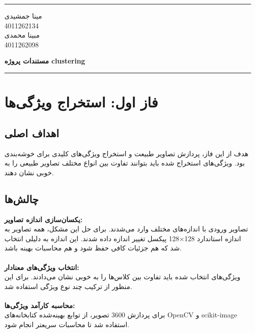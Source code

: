 \documentclass[a4paper,12pt]{article}
\newcommand{\StudentOne}{4011262134}
\newcommand{\StudentTwo}{4011262098}
\newcommand{\NameOne}{مینا جمشیدی}
\newcommand{\NameTwo}{مبینا محمدی}
\newcommand{\ProjectName}{مستندات پروژه clustering}
\let\nobreaksection\section
\renewcommand{\section}{\nobreaksection}
\begin{document}
	

	\hrule \medskip
	\begin{minipage}{0.3\textwidth}
		\raggedright
		\small
		\NameOne \\
		\StudentOne \\
		\NameTwo \\
		\StudentTwo
	\end{minipage}
	\begin{minipage}{0.4\textwidth} 
		\centering 
		\large\bfseries
		\ProjectName \\
	\end{minipage}
	\begin{minipage}{0.3\textwidth}
		\raggedleft
		\small
	\end{minipage}
	\medskip\hrule 
	\vspace*{1.5cm}  
	

\section{فاز اول: استخراج ویژگی‌ها}

\subsection*{\textbf{اهداف اصلی}}
هدف از این فاز، پردازش تصاویر طبیعت و استخراج ویژگی‌های کلیدی برای خوشه‌بندی بود. ویژگی‌های استخراج شده باید بتوانند تفاوت بین انواع مختلف تصاویر طبیعی را به خوبی نشان دهند.

\subsection*{\textbf{چالش‌ها}}

\textbf{یکسان‌سازی اندازه تصاویر:}\\
تصاویر ورودی با اندازه‌های مختلف وارد می‌شدند. برای حل این مشکل، همه تصاویر به اندازه استاندارد 128×128 پیکسل تغییر اندازه داده شدند. این اندازه به دلیلی انتخاب شد که هم جزئیات کافی حفظ شود و هم محاسبات بهینه باشد.
\\
\\
\textbf{انتخاب ویژگی‌های معنادار:}\\
ویژگی‌های انتخاب شده باید تفاوت بین کلاس‌ها را به خوبی نشان می‌دادند. برای این منظور از ترکیب چند نوع ویژگی استفاده شد.
\\
\\
\textbf{محاسبه کارآمد ویژگی‌ها:}\\
برای پردازش 3600 تصویر، از توابع بهینه‌شده کتابخانه‌های OpenCV و scikit-image استفاده شد تا محاسبات سریعتر انجام شود.
\end{document}
